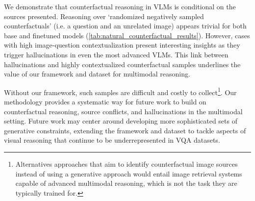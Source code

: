 
We demonstrate that counterfactual reasoning in VLMs is conditional on the sources presented. Reasoning over `randomized negatively sampled counterfactuals' (i.e. a question and an unrelated image) appears trivial for both base and finetuned models (\autoref{tab:natural_counterfactual_results}). However, cases with high image-question contextualization present interesting insights as they trigger hallucinations in even the most advanced VLMs. This link between hallucinations and highly contextualized counterfactual samples underlines the value of our framework and dataset for multimodal reasoning.

Without our framework, such samples are difficult and costly to collect\footnote{Alternatives approaches that aim to identify counterfactual image sources instead of using a generative approach would entail image retrieval systems capable of advanced multimodal reasoning, which is not the task they are typically trained for.}. Our methodology provides a systematic way for future work to build on counterfactual reasoning, source conflicts, and hallucinations in the multimodal setting. Future work may center around developing more sophisticated sets of generative constraints, extending the \segsub framework and dataset to tackle aspects of visual reasoning that continue to be underrepresented in VQA datasets. 









